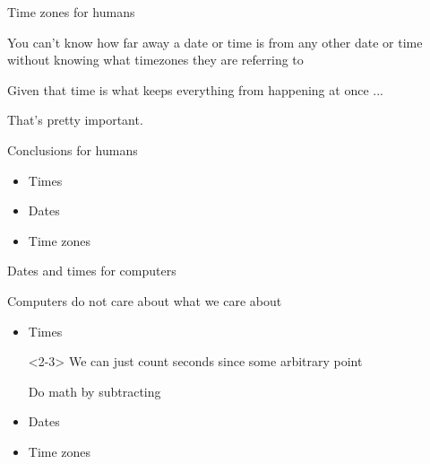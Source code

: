 \documentclass[xcolor=svgnames,17pt]{beamer}
\begin{document}
\begin{frame}{Time zones for humans}

You can’t know how far away a date or time is from any other date or time
without knowing what timezones they are referring to \\[\baselineskip]

\pause

Given that time is what keeps everything from happening at once ...
\\[\baselineskip]

\pause

That’s pretty important.

\end{frame}

\begin{frame}{Conclusions for humans}

\begin{itemize}
\item Times


\item Dates


\item Time zones


\end{itemize}


\end{frame}

\begin{frame}{Dates and times for computers}

Computers do not care about what we care about

\pause

\begin{itemize}
\item \alert<1-2>{Times}

\begin{onlyenv}<2-3>
We can just count seconds since some arbitrary point

Do math by subtracting
\end{onlyenv}


\item \alert<4>{Dates}
\item \alert<4>{Time zones}


\end{itemize}

\end{frame}
\end{document}
